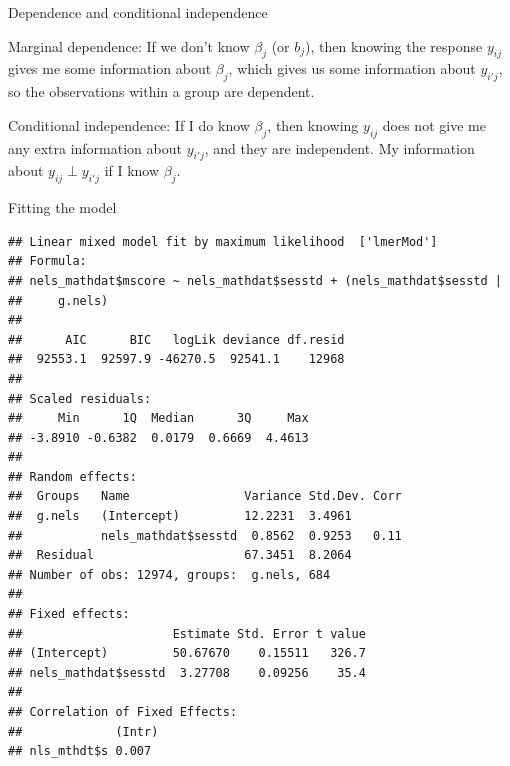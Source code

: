 \documentclass[ignorenonframetext,]{beamer}
\newenvironment{Shaded}{\begin{snugshade}}{\end{snugshade}}
\newcommand{\KeywordTok}[1]{\textcolor[rgb]{0.13,0.29,0.53}{\textbf{#1}}}
\newcommand{\DataTypeTok}[1]{\textcolor[rgb]{0.13,0.29,0.53}{#1}}
\newcommand{\CommentTok}[1]{\textcolor[rgb]{0.56,0.35,0.01}{\textit{#1}}}
\newcommand{\OtherTok}[1]{\textcolor[rgb]{0.56,0.35,0.01}{#1}}
\newcommand{\OperatorTok}[1]{\textcolor[rgb]{0.81,0.36,0.00}{\textbf{#1}}}
\newcommand{\NormalTok}[1]{#1}
\begin{document}
\begin{frame}{Dependence and conditional independence}

Marginal dependence: If we don't know \(\beta_j\) (or \(b_j\)), then
knowing the response \(y_{ij}\) gives me some information about
\(\beta_j\), which gives us some information about \(y_{i'j}\), so the
observations within a group are dependent.

Conditional independence: If I do know \(\beta_j\), then knowing
\(y_{ij}\) does not give me any extra information about \(y_{i'j}\), and
they are independent. My information about \(y_{ij} \perp y_{i'j}\) if I
know \(\beta_j\).

\end{frame}

\begin{frame}[fragile]{Fitting the model}

\begin{Shaded}
\end{Shaded}

\begin{verbatim}
## Linear mixed model fit by maximum likelihood  ['lmerMod']
## Formula: 
## nels_mathdat$mscore ~ nels_mathdat$sesstd + (nels_mathdat$sesstd |  
##     g.nels)
## 
##      AIC      BIC   logLik deviance df.resid 
##  92553.1  92597.9 -46270.5  92541.1    12968 
## 
## Scaled residuals: 
##     Min      1Q  Median      3Q     Max 
## -3.8910 -0.6382  0.0179  0.6669  4.4613 
## 
## Random effects:
##  Groups   Name                Variance Std.Dev. Corr
##  g.nels   (Intercept)         12.2231  3.4961       
##           nels_mathdat$sesstd  0.8562  0.9253   0.11
##  Residual                     67.3451  8.2064       
## Number of obs: 12974, groups:  g.nels, 684
## 
## Fixed effects:
##                     Estimate Std. Error t value
## (Intercept)         50.67670    0.15511   326.7
## nels_mathdat$sesstd  3.27708    0.09256    35.4
## 
## Correlation of Fixed Effects:
##             (Intr)
## nls_mthdt$s 0.007
\end{verbatim}

\end{frame}
\end{document}
